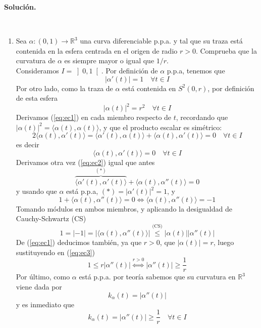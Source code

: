 \documentclass[12pt]{article}
\newcommand{\R}{\mathbb{R}}
\newcommand{\prodesc}[2]{\langle #1, #2 \rangle}
\begin{document}
    \newpage
    \setcounter{ejercicio}{0} %
    \noindent
    \textbf{Solución.}

    \begin{ejercicio}~
        \begin{enumerate}
            \item[a)] Sea $\alpha : (0,1) \to \mathbb{R}^3$ una curva diferenciable p.p.a. y tal que su traza está
            contenida en la esfera centrada en el origen de radio $r > 0$. Comprueba que la curvatura de $\alpha$ es 
            siempre mayor o igual que $1/r$. \\

            Consideramos $I = \left]0,1 \right[$. Por definición de $\alpha$ p.p.a, tenemos que $$|\alpha'(t)| = 1 \quad \forall t \in I$$
            Por otro lado, como la traza de $\alpha$ está contenida en $S^2(0,r)$, por definición de esta esfera
            \begin{equation}\label{eq:ec1}
                |\alpha(t)|^2 = r^2 \quad \forall t \in I
            \end{equation}
            Derivamos (\ref{eq:ec1}) en cada miembro respecto de $t$, recordando que 
            $|\alpha(t)|^2 = \prodesc{\alpha(t)}{\alpha(t)}$, y que el producto escalar es simétrico:
            $$2 \prodesc{\alpha(t)}{\alpha'(t)} = \prodesc{\alpha'(t)}{\alpha(t)} + \prodesc{\alpha(t)}{\alpha'(t)} = 
            0 \quad \forall t \in I$$
            es decir
            \begin{equation}\label{eq:ec2}
                \prodesc{\alpha(t)}{\alpha'(t)} = 0 \quad \forall t \in I
            \end{equation}
            Derivamos otra vez (\ref{eq:ec2}) igual que antes
            $$\overbrace{\prodesc{\alpha'(t)}{\alpha'(t)}}^{(*)} + \prodesc{\alpha(t)}{\alpha''(t)} = 0$$
            y usando que $\alpha$ está p.p.a, $(*) = |\alpha'(t)|^2 = 1$, y
            $$1 + \prodesc{\alpha(t)}{\alpha''(t)} = 0 \iff \prodesc{\alpha(t)}{\alpha''(t)} = -1$$
            Tomando módulos en ambos miembros, y aplicando la desigualdad de Cauchy-Schwartz (CS)
            \begin{equation}\label{eq:ec3}
                1 = |-1| = |\prodesc{\alpha(t)}{\alpha''(t)}| \stackrel{\text{(CS)}}{\leq} |\alpha(t)| |\alpha''(t)|
            \end{equation}
            De (\ref{eq:ec1}) deducimos también, ya que $r > 0$, que $|\alpha(t)| = r$, luego sustituyendo en (\ref{eq:ec3})
            $$1 \leq r |\alpha''(t)| \stackrel{r > 0}{\iff} |\alpha''(t)| \geq \dfrac{1}{r}$$
            Por último, como $\alpha$ está p.p.a. por teoría sabemos que su curvatura en $\R^3$ viene dada por
            $$k_\alpha(t) = |\alpha''(t)|$$
            y es inmediato que
            $$\boxed{k_\alpha(t) = |\alpha''(t)| \geq \dfrac{1}{r} \quad \forall t \in I}$$


\end{enumerate}
\end{ejercicio}
\end{document}
